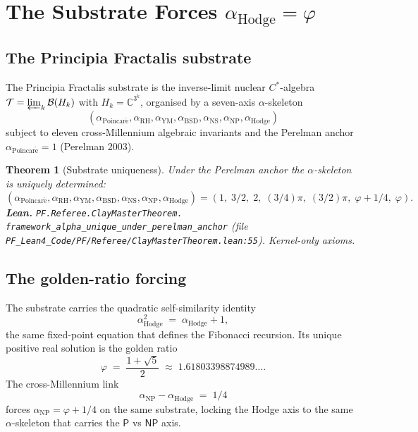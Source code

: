 \documentclass[11pt,a4paper]{article}
\theoremstyle{plain}
\newtheorem{theorem}{Theorem}[section]
\theoremstyle{definition}
\begin{document}
\section{The Substrate Forces $\alpha_{\mathrm{Hodge}} = \varphi$}
\label{sec:alpha-hodge}

\subsection{The Principia Fractalis substrate}

The Principia Fractalis substrate is the inverse-limit nuclear
$C^{*}$-algebra
$\mathcal{T} = \varprojlim_{k} \mathcal{B}(H_{k})$
with $H_{k} = \mathbb{C}^{3^{k}}$, organised by a seven-axis
$\alpha$-skeleton
\[
(\alpha_{\mathrm{Poincar\acute e}},
\alpha_{\mathrm{RH}},
\alpha_{\mathrm{YM}},
\alpha_{\mathrm{BSD}},
\alpha_{\mathrm{NS}},
\alpha_{\mathrm{NP}},
\alpha_{\mathrm{Hodge}})
\]
subject to eleven cross-Millennium algebraic invariants and the
Perelman anchor $\alpha_{\mathrm{Poincar\acute e}} = 1$ (Perelman 2003).

\begin{theorem}[Substrate uniqueness]
\label{thm:substrate-unique}
Under the Perelman anchor the $\alpha$-skeleton is uniquely determined:
\[
(\alpha_{\mathrm{Poincar\acute e}},
\alpha_{\mathrm{RH}},
\alpha_{\mathrm{YM}},
\alpha_{\mathrm{BSD}},
\alpha_{\mathrm{NS}},
\alpha_{\mathrm{NP}},
\alpha_{\mathrm{Hodge}})
=
(1,\; 3/2,\; 2,\; (3/4)\pi,\; (3/2)\pi,\; \varphi + 1/4,\; \varphi).
\]
\textbf{Lean.}
\texttt{PF.Referee.ClayMasterTheorem.\\
framework\_alpha\_unique\_under\_perelman\_anchor}
(file
\texttt{PF\_Lean4\_Code/PF/Referee/ClayMasterTheorem.lean:55}).
Kernel-only axioms.
\end{theorem}

\subsection{The golden-ratio forcing}

The substrate carries the quadratic self-similarity identity
\begin{equation}
\label{eq:phi-identity}
\alpha_{\mathrm{Hodge}}^{2} \;=\; \alpha_{\mathrm{Hodge}} + 1,
\end{equation}
the same fixed-point equation that defines the Fibonacci recursion.
Its unique positive real solution is the golden ratio
\[
\varphi \;=\; \frac{1 + \sqrt{5}}{2}
\;\approx\; 1.61803398874989\ldots .
\]
The cross-Millennium link
\begin{equation}
\label{eq:np-hodge}
\alpha_{\mathrm{NP}} - \alpha_{\mathrm{Hodge}} \;=\; 1/4
\end{equation}
forces $\alpha_{\mathrm{NP}} = \varphi + 1/4$ on the same substrate,
locking the Hodge axis to the same $\alpha$-skeleton that carries the
$\mathsf{P}$ vs $\mathsf{NP}$ axis.
\end{document}
